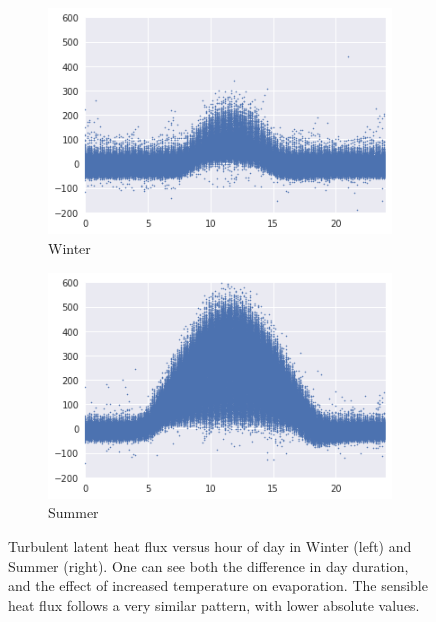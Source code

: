\documentclass[12pt]{book}
\begin{document}
\begin{figure}
    \centering
    \begin{subfigure}[t]{0.48\textwidth}
        \centering
        \includegraphics[width=\textwidth]{images/le_winter}
        \caption{Winter}
        \label{fig:le_winter}
    \end{subfigure}
    \hfill
    \begin{subfigure}[t]{0.45\textwidth}
        \centering
        \includegraphics[width=\textwidth]{images/le_summer}
        \caption{Summer}
        \label{fig:le_summer}
    \end{subfigure}
    \caption{Turbulent latent heat flux versus hour of day in Winter (left) and Summer (right). One can see both the difference in day duration, and the effect of increased temperature on evaporation. The sensible heat flux follows a very similar pattern, with lower absolute values.}
	\label{fig:le_season}
\end{figure}
\end{document}
